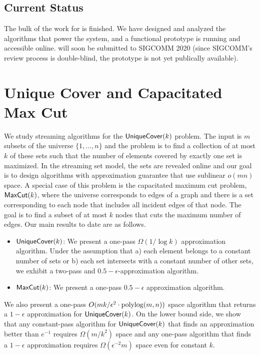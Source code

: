 \subsection{Current Status}
The bulk of the work for \sysname{} is finished.  We have designed and analyzed the algorithms that power the system, and a functional prototype is running and accessible online.  \sysname{} will soon be submitted to SIGCOMM 2020 (since SIGCOMM's review process is double-blind, the prototype is not yet  publically available).

\section{Unique Cover and Capacitated Max Cut}
\label{sec:uc}

We study streaming algorithms for the $\uc(k)$ problem. 
The input is $m$ subsets of the universe $\{1,\ldots,n\}$ and the problem is to find a collection of at most $k$ of these sets such that the number of elements covered by exactly one set is maximized. In the streaming set model, the sets are revealed online and our goal is to design algorithms with approximation guarantee that use sublinear $o(mn)$ space. A special case of this problem is the capacitated maximum cut problem, $\maxcut(k)$, where the universe corresponds to edges of a graph and there is a set corresponding to each node that includes all incident edges of that node. The goal is to find a subset of at most $k$ nodes that cuts the maximum number of edges. 
Our main results to date are as follows.%
\begin{itemize}
\item $\uc(k)$: We present a one-pass $\Omega(1/\log k)$ approximation algorithm. Under the assumption that a) each element belongs to a constant number of sets or b) each set intersects with a constant number of other sets, we exhibit a two-pass and $0.5-\epsilon$-approximation algorithm.  
\item $\maxcut(k)$: We present a one-pass $0.5-\epsilon$ approximation algorithm.
\end{itemize} 
We also present a one-pass $O(mk/\epsilon^{2} \cdot \operatorname{polylog}(m,n))$ space algorithm that returns a $1-\epsilon$ approximation for $\uc(k)$. On the lower bound side, we show that any constant-pass algorithm for $\uc(k)$ that finds an approximation better than $e^{-1}$ requires $\Omega(m/k^2)$ space and any one-pass algorithm that finds a $1-\epsilon$ approximation requires $\Omega(\epsilon^{-2} m)$ space even for constant $k$.

